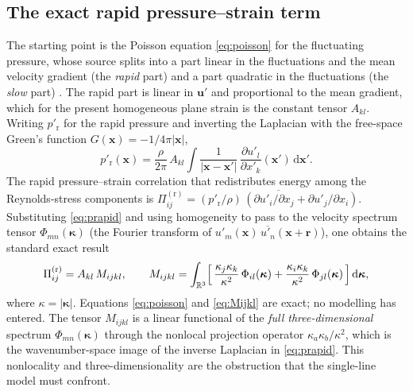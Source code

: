 \documentclass[lineno]{JFM-FLM_Au}
\begin{document}
\subsection{The exact rapid pressure--strain term}\label{sec:exact-pi}

The starting point is the Poisson equation \eqref{eq:poisson} for the
fluctuating pressure, whose source splits into a part linear in the
fluctuations and the mean velocity gradient (the \emph{rapid} part) and a
part quadratic in the fluctuations (the \emph{slow} part)
\citep{Pope2000}. The rapid part is linear in $\boldsymbol{u}'$ and
proportional to the mean gradient, which for the present homogeneous
plane strain is the constant tensor $A_{kl}$. Writing
$p'_{\mathrm r}$ for the rapid pressure and inverting the Laplacian with the
free-space Green's function $G(\boldsymbol{x})=-1/4\pi|\boldsymbol{x}|$,
\begin{equation}
  p'_{\mathrm r}(\boldsymbol{x})
  = \frac{\rho}{2\pi}\,A_{kl}\!\int
    \frac{1}{|\boldsymbol{x}-\boldsymbol{x}'|}\,
    \frac{\partial u'_l}{\partial x'_k}(\boldsymbol{x}')\,
    \mathrm{d}\boldsymbol{x}' .
  \label{eq:prapid}
\end{equation}
The rapid pressure--strain correlation that redistributes energy among the
Reynolds-stress components is
$\Pi^{(\mathrm r)}_{ij}
   = \overline{(p'_{\mathrm r}/\rho)\,(\partial u'_i/\partial x_j
     + \partial u'_j/\partial x_i)}$.
Substituting \eqref{eq:prapid} and using homogeneity to pass to the
velocity spectrum tensor
$\Phi_{mn}(\boldsymbol{\kappa})$
(the Fourier transform of $\overline{u'_m(\boldsymbol{x})\,
u'_n(\boldsymbol{x}+\boldsymbol{r})}$),
one obtains the standard exact result
\citep{BatchelorProudman1954,Crow1968,HuntCarruthers1990}
\begin{equation}
  \Pi^{(\mathrm r)}_{ij}
  = A_{kl}\,M_{ijkl},
  \qquad
  M_{ijkl}
  = \int_{\mathbb{R}^3}
    \Bigl[\,
      \frac{\kappa_j\kappa_k}{\kappa^2}\,\Phi_{il}(\boldsymbol{\kappa})
      + \frac{\kappa_i\kappa_k}{\kappa^2}\,\Phi_{jl}(\boldsymbol{\kappa})
    \,\Bigr]\,\mathrm{d}\boldsymbol{\kappa},
  \label{eq:Mijkl}
\end{equation}
where $\kappa=|\boldsymbol{\kappa}|$. Equations
\eqref{eq:poisson} and \eqref{eq:Mijkl} are exact; no modelling has entered. The
tensor $M_{ijkl}$ is a linear functional of the \emph{full three-dimensional}
spectrum $\Phi_{mn}(\boldsymbol{\kappa})$ through the nonlocal projection
operator $\kappa_a\kappa_b/\kappa^2$, which is the wavenumber-space image of
the inverse Laplacian in \eqref{eq:prapid}. This nonlocality and
three-dimensionality are the obstruction that the single-line model must
confront.
\end{document}

